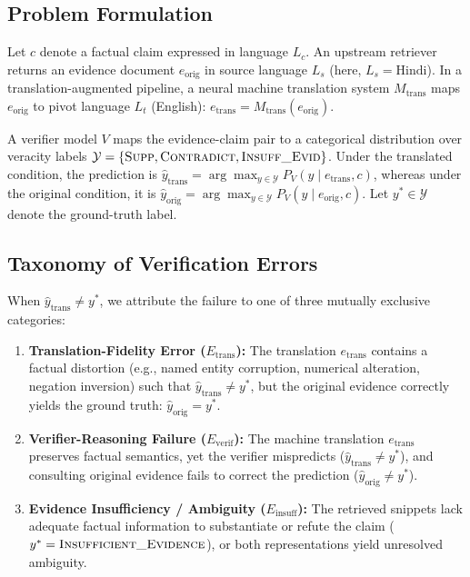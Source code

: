 \documentclass[11pt,a4paper]{article}
\begin{document}
\subsection{Problem Formulation}
Let $c$ denote a factual claim expressed in language $L_c$. An upstream retriever returns an evidence document $e_{\text{orig}}$ in source language $L_s$ (here, $L_s = \text{Hindi}$). In a translation-augmented pipeline, a neural machine translation system $M_{\text{trans}}$ maps $e_{\text{orig}}$ to pivot language $L_t$ (English): $e_{\text{trans}} = M_{\text{trans}}(e_{\text{orig}})$.

A verifier model $V$ maps the evidence-claim pair to a categorical distribution over veracity labels $\mathcal{Y} = \{\textsc{Supp}, \textsc{Contradict}, \textsc{Insuff\_Evid}\}$. Under the translated condition, the prediction is $\hat{y}_{\text{trans}} = \arg\max_{y \in \mathcal{Y}} P_V(y \mid e_{\text{trans}}, c)$, whereas under the original condition, it is $\hat{y}_{\text{orig}} = \arg\max_{y \in \mathcal{Y}} P_V(y \mid e_{\text{orig}}, c)$. Let $y^* \in \mathcal{Y}$ denote the ground-truth label.

\subsection{Taxonomy of Verification Errors}
When $\hat{y}_{\text{trans}} \ne y^*$, we attribute the failure to one of three mutually exclusive categories:
\begin{enumerate}
    \item \textbf{Translation-Fidelity Error ($E_{\text{trans}}$):} The translation $e_{\text{trans}}$ contains a factual distortion (e.g., named entity corruption, numerical alteration, negation inversion) such that $\hat{y}_{\text{trans}} \ne y^*$, but the original evidence correctly yields the ground truth: $\hat{y}_{\text{orig}} = y^*$.
    \item \textbf{Verifier-Reasoning Failure ($E_{\text{verif}}$):} The machine translation $e_{\text{trans}}$ preserves factual semantics, yet the verifier mispredicts ($\hat{y}_{\text{trans}} \ne y^*$), and consulting original evidence fails to correct the prediction ($\hat{y}_{\text{orig}} \ne y^*$).
    \item \textbf{Evidence Insufficiency / Ambiguity ($E_{\text{insuff}}$):} The retrieved snippets lack adequate factual information to substantiate or refute the claim ($y^* = \textsc{Insufficient\_Evidence}$), or both representations yield unresolved ambiguity.
\end{enumerate}
\end{document}
